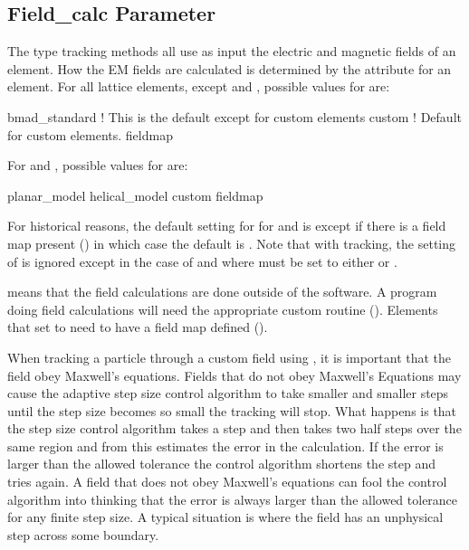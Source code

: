 \subsection{Field_calc Parameter}
\label{s:field.calc}

The  type tracking methods all use as input the electric and magnetic fields of
an element. How the EM fields are calculated is determined by the  attribute for an
element.  For all lattice elements, except  and , possible values for
 are:
\begin{example}
  bmad_standard     ! This is the default except for custom elements
  custom            ! Default for custom elements.
  fieldmap
\end{example}
For  and , possible values for  are:
\begin{example}
  planar_model
  helical_model
  custom
  fieldmap
\end{example}
For historical reasons, the default setting for  for  and
 is  except if there is a field map present () in
which case the default is .  Note that with  tracking, the setting of
 is ignored except in the case of  and  where
 must be set to either  or .

 means that the field calculations are done outside of the \bmad software. A program
doing  field calculations will need the appropriate custom routine ().
Elements that set  to  need to have a field map defined
().

 When tracking a particle through a custom field using , it is
important that the field obey Maxwell's equations. Fields that do not obey Maxwell's Equations may
cause the  adaptive step size control algorithm to take smaller and smaller steps
until the step size becomes so small the tracking will stop. What happens is that the step size
control algorithm takes a step and then takes two half steps over the same region and from this
estimates the error in the calculation. If the error is larger than the allowed tolerance the
control algorithm shortens the step and tries again. A field that does not obey Maxwell's equations
can fool the control algorithm into thinking that the error is always larger than the allowed
tolerance for any finite step size. A typical situation is where the field has an unphysical step
across some boundary.


